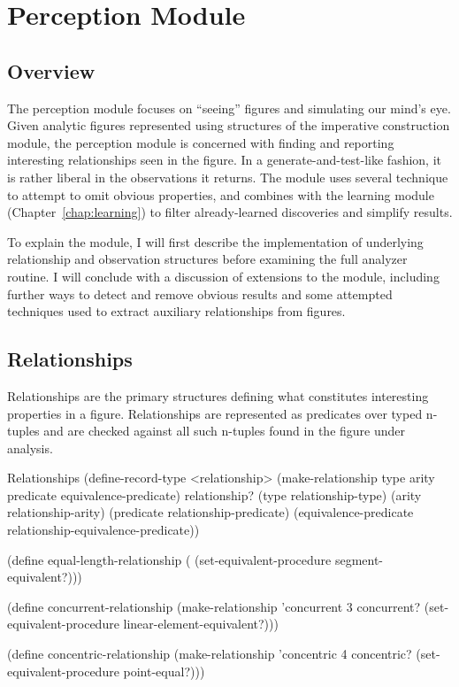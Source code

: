 \chapter{Perception Module}
\label{chap:observer}


\section{Overview}

The perception module focuses on ``seeing'' figures and simulating our
mind's eye.  Given analytic figures represented using structures of
the imperative construction module, the perception module is concerned
with finding and reporting interesting relationships seen in the
figure. In a generate-and-test-like fashion, it is rather liberal in
the observations it returns. The module uses several technique to
attempt to omit obvious properties, and combines with the learning
module (Chapter~\ref{chap:learning}) to filter already-learned
discoveries and simplify results.

To explain the module, I will first describe the implementation of
underlying relationship and observation structures before examining
the full analyzer routine. I will conclude with a discussion of
extensions to the module, including further ways to detect and remove
obvious results and some attempted techniques used to extract
auxiliary relationships from figures.

\section{Relationships}

Relationships are the primary structures defining what constitutes
interesting properties in a figure. Relationships are represented as
predicates over typed n-tuples and are checked against all such
n-tuples found in the figure under analysis.

\begin{code-listing}
[label=relationship-structure]
{Relationships}
(define-record-type <relationship>
  (make-relationship type arity predicate equivalence-predicate)
  relationship?
  (type relationship-type)
  (arity relationship-arity)
  (predicate relationship-predicate)
  (equivalence-predicate relationship-equivalence-predicate))

(define equal-length-relationship
  (%
                      (set-equivalent-procedure segment-equivalent?)))

(define concurrent-relationship
  (make-relationship 'concurrent 3 concurrent?
                      (set-equivalent-procedure linear-element-equivalent?)))

(define concentric-relationship
  (make-relationship 'concentric 4 concentric?
                      (set-equivalent-procedure point-equal?)))
\end{code-listing}

